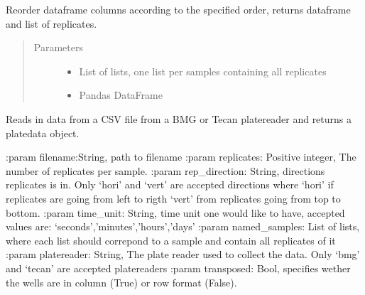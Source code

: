 \documentclass[letterpaper,10pt,english]{sphinxmanual}
\begin{document}

\begin{fulllineitems}
\label{\detokenize{platelib:platelib.plateread.named_order}}
Reorder dataframe columns according to the specified order, returns dataframe and list of replicates.
\begin{quote}\begin{description}
\item[{Parameters}] \leavevmode\begin{itemize}
\item {} 
 \textendash{} List of lists, one list per samples containing all replicates

\item {} 
 \textendash{} Pandas DataFrame

\end{itemize}

\end{description}\end{quote}

\end{fulllineitems}


\begin{fulllineitems}
\label{\detokenize{platelib:platelib.plateread.read_plate}}
Reads in data from a CSV file from a BMG or Tecan platereader and returns a platedata object.

:param filename:String, path to filename
:param replicates: Positive integer, The number of replicates per sample.
:param rep\_direction: String, directions replicates is in. Only ‘hori’ and ‘vert’ are accepted directions where ‘hori’ if replicates are going from left to rigth ‘vert’ from replicates going from top to bottom. 
:param time\_unit: String, time unit one would like to have, accepted values are: ‘seconds’,’minutes’,’hours’,’days’  
:param named\_samples: List of lists,  where each list should correpond to a sample and contain all replicates of it 
:param platereader: String, The plate reader used to collect the data. Only ‘bmg’ and ‘tecan’ are accepted platereaders
:param transposed: Bool, specifies wether the wells are in column (True) or row format (False).

\end{fulllineitems}
\end{document}
